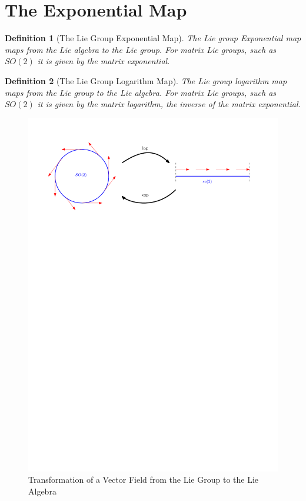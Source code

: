 \documentclass{book}
\newtheorem{definition}{Definition}
\begin{document}
\section{The Exponential Map}

\begin{definition}[The Lie Group Exponential Map]
The Lie group Exponential map maps from the Lie algebra to the Lie group.
For matrix Lie groups, such as $SO(2)$ it is given by the matrix
exponential.
\end{definition}

\begin{definition}[The Lie Group Logarithm Map]
The Lie group logarithm map maps from the Lie group to the Lie algebra.
For matrix Lie groups, such as $SO(2)$ it is given by the matrix
logarithm, the inverse of the matrix exponential.
\end{definition}

\begin{figure}[htp]
    \centering
    \includegraphics[width=\textwidth]{SO2_so2_vector_field}
    \caption{Transformation of a Vector Field from the Lie Group to the Lie Algebra}
\end{figure}
\end{document}
